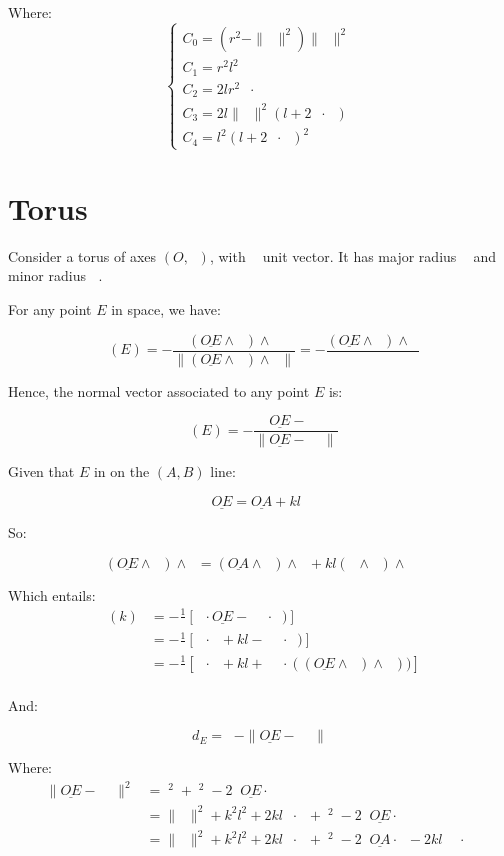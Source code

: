\documentclass[10pt,a4paper]{article}
\newcommand{\ud}[1]{\underline{#1}}
\DeclareMathOperator{\cross}{\wedge}
\DeclareMathOperator{\OA}{\ud{OA}}
\DeclareMathOperator{\z}{\ud{z}}
\DeclareMathOperator{\e}{\ud{e}}
\DeclareMathOperator{\n}{\ud{n}}
\DeclareMathOperator{\en}{\ud{e}\cdot\ud{n}}
\DeclareMathOperator{\OEz}{\|\ud{OE} \cross \z\|}
\DeclareMathOperator{\OEn}{\|\ud{OE}\|}
\DeclareMathOperator{\ra}{r_{a}}
\DeclareMathOperator{\ea}{\ud{e}_{a}}
\DeclareMathOperator{\rb}{r_{b}}
\DeclareMathOperator{\OEa}{\|\ud{OE} \cross \ra\ea\|}
\begin{document}
Where:
$$
\left\{
\begin{array}{llll}
    C_0 = (r^2 - \|\OA\|^2)\|\OA\|^2\\
    C_1 = r^2l^2\\
    C_2 = 2lr^2\OA\cdot\e\\
    C_3 = 2l\|\OA\|^2(l + 2\OA\cdot\e)\\
    C_4 = l^2(l + 2\OA\cdot\e)^2
\end{array}
\right.
$$

\newpage
\section{Torus}

Consider a torus of axes $(O, \z)$, with $\z$  unit vector.
It has major radius $\ra$ and minor radius $\rb$.

For any point $E$ in space, we have:

$$
    \ea(E) = - \frac{(\ud{OE} \cross  \z) \cross \z}{
    \|(\ud{OE} \cross  \z) \cross \z\|
}
    = - \frac{(\ud{OE} \cross  \z) \cross \z}{\OEz}
$$

Hence, the  normal vector associated to any point $E$ is:

$$
\n(E) = - \frac{\ud{OE} - \ra\ea}{\|\ud{OE} - \ra\ea\|}
$$

Given that $E$ in on the $(A, B)$ line:

$$
\ud{OE} = \ud{OA} + kl\e
$$

So:

$$
(\ud{OE} \cross \z) \cross \z
= (\ud{OA} \cross \z) \cross \z + kl( \e \cross \z )\cross \z
$$

Which entails:
$$
\begin{array}{ll}
    \en(k)
    & = - \frac{1}{\OEa}\left[ \e \cdot \ud{OE} - \ra \e \cdot \ea)\right]\\
    & = - \frac{1}{\OEa}\left[ \e \cdot \OA + kl - \ra \e \cdot \ea)\right]\\
    & = - \frac{1}{\OEa}\left[ 
    \e \cdot \OA + kl
    + \frac{\ra}{\OEz} \e \cdot \left((\ud{OE} \cross \z) \cross \z\right))
    \right]\\
\end{array}
$$

And:

$$
d_E = \rb - \|\ud{OE} - \ra\ea\|
$$

Where:
$$
\begin{array}{ll}
    \|\ud{OE} - \ra\ea\|^2
    & = \OEn^2 + \ra^2 - 2\ra\ud{OE}\cdot\ea\\
    & = \|\OA\|^2 + k^2l^2 + 2kl\OA\cdot\e + \ra^2 - 2\ra\ud{OE}\cdot\ea\\
    & = \|\OA\|^2 + k^2l^2 + 2kl\OA\cdot\e + \ra^2
    - 2\ra\ud{OA}\cdot\ea - 2kl\ra\e\cdot\ea\\
\end{array}
$$
\end{document}
